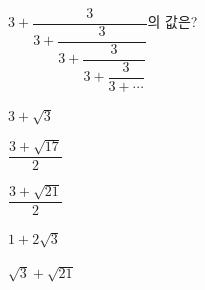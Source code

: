 $3+\dfrac{3}{3+\dfrac{3}{3+\dfrac{3}{3+\dfrac{3}{3+\cdots}}}}$의 값은?
\begin{choices32}{\rule[-3ex]{0pt}{8ex}$3+\sqrt{3}$}{\rule[-3ex]{0pt}{8ex}$\dfrac{3+\sqrt{17}}{2}$}{\rule[-3ex]{0pt}{8ex}$\dfrac{3+\sqrt{21}}{2}$}{\rule[-3ex]{0pt}{8ex}$1+2\sqrt{3}$}{\rule[-3ex]{0pt}{8ex}$\sqrt{3}+\sqrt{21}$}\end{choices32}
